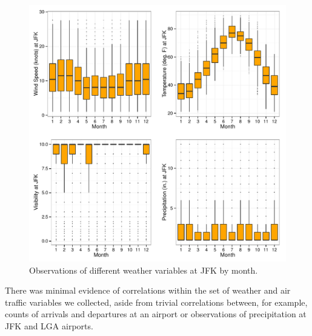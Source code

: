 \documentclass[11pt]{scrartcl}
\begin{document}
\begin{figure}[h]
\begin{center}
\includegraphics[scale=0.80]{./figures/Fig4.pdf}
\caption{Observations of different weather variables at JFK by month.}
\label{default}
\end{center}
\end{figure}
\par\noindent
There was minimal evidence of correlations within the set of weather and air traffic variables we collected, aside from trivial correlations between, for example, counts of arrivals and departures at an airport or observations of precipitation at JFK and LGA airports.
\newpage\noindent
\end{document}
